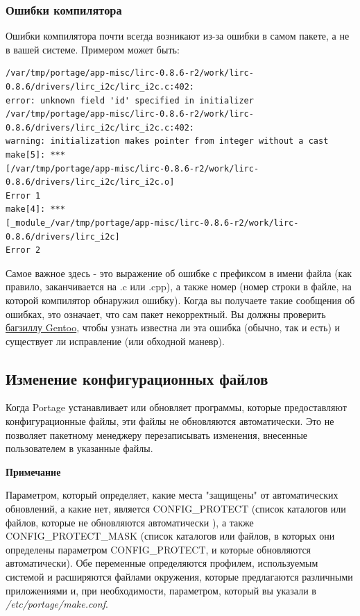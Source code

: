 \documentclass[10pt]{book}
\begin{document}
\subsubsection{Ошибки компилятора}

Ошибки компилятора почти всегда возникают из-за ошибки в самом пакете, а не в вашей системе. Примером может быть:
 
\begin{tcolorbox}
\begin{lstlisting}
/var/tmp/portage/app-misc/lirc-0.8.6-r2/work/lirc-0.8.6/drivers/lirc_i2c/lirc_i2c.c:402:
error: unknown field 'id' specified in initializer
/var/tmp/portage/app-misc/lirc-0.8.6-r2/work/lirc-0.8.6/drivers/lirc_i2c/lirc_i2c.c:402:
warning: initialization makes pointer from integer without a cast
make[5]: ***
[/var/tmp/portage/app-misc/lirc-0.8.6-r2/work/lirc-0.8.6/drivers/lirc_i2c/lirc_i2c.o]
Error 1
make[4]: ***
[_module_/var/tmp/portage/app-misc/lirc-0.8.6-r2/work/lirc-0.8.6/drivers/lirc_i2c]
Error 2
\end{lstlisting}
\end{tcolorbox}

Самое важное здесь - это выражение об ошибке с префиксом в имени файла (как правило, заканчивается на .c или .cpp), а также номер (номер строки в файле, на которой компилятор обнаружил ошибку). Когда вы получаете такие сообщения об ошибках, это означает, что сам пакет некорректный. Вы должны проверить \href{https://bugs.gentoo.org}{багзиллу Gentoo}, чтобы узнать известна ли эта ошибка (обычно, так и есть) и существует ли исправление (или обходной маневр).

\subsection{Изменение конфигурационных файлов}
Когда Portage устанавливает или обновляет программы, которые предоставляют конфигурационные файлы, эти файлы не обновляются автоматически. Это не позволяет пакетному менеджеру перезаписывать изменения, внесенные пользователем в указанные файлы.

{\scriptsize{\textbf{Примечание}

Параметром, который определяет, какие места "защищены" от автоматических обновлений, а какие нет, является  CONFIG\_PROTECT (список каталогов или файлов, которые не обновляются автоматически ), а также CONFIG\_PROTECT\_MASK (список каталогов или файлов, в которых они определены параметром CONFIG\_PROTECT, и которые обновляются автоматически). Обе переменные определяются профилем, используемым системой и расширяются файлами окружения, которые предлагаются различными приложениями и, при необходимости, параметром, который вы указали в \textit{/etc/portage/make.conf}.
}}
\end{document}
